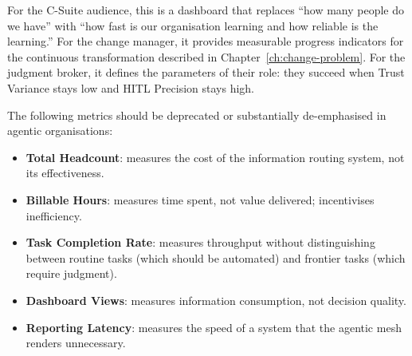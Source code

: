 For the C-Suite audience, this is a dashboard that replaces ``how many people do we have'' with ``how fast is our organisation learning and how reliable is the learning.'' For the change manager, it provides measurable progress indicators for the continuous transformation described in Chapter~\ref{ch:change-problem}. For the judgment broker, it defines the parameters of their role: they succeed when Trust Variance stays low and HITL Precision stays high.

\begin{keyinsight}[title={Abandoning Legacy KPIs}]
The following metrics should be deprecated or substantially de-emphasised in agentic organisations:
\begin{itemize}
  \item \textbf{Total Headcount}: measures the cost of the information routing system, not its effectiveness.
  \item \textbf{Billable Hours}: measures time spent, not value delivered; incentivises inefficiency.
  \item \textbf{Task Completion Rate}: measures throughput without distinguishing between routine tasks (which should be automated) and frontier tasks (which require judgment).
  \item \textbf{Dashboard Views}: measures information consumption, not decision quality.
  \item \textbf{Reporting Latency}: measures the speed of a system that the agentic mesh renders unnecessary.
\end{itemize}
\end{keyinsight}
